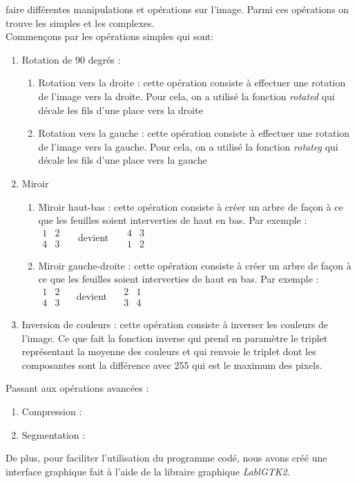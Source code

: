 \documentclass[12pt]{article}
\begin{document}
faire différentes manipulations et opérations sur l'image. Parmi ces opérations on trouve les simples et les complexes. \\
Commençons par les opérations simples qui sont:
\begin{enumerate}
\item Rotation de 90 degrés :
\begin{enumerate}
\item Rotation vers la droite : cette opération consiste à effectuer une rotation de l'image vers la droite. Pour cela, on a utilisé la fonction \textit{rotated} qui décale les fils d'une place vers la droite	
\item Rotation vers la gauche : cette opération consiste à effectuer une rotation de l'image vers la gauche. Pour cela, on a utilisé la fonction \textit{rotateg} qui décale les fils d'une place vers la gauche   
\end{enumerate}
\item Miroir
\begin{enumerate}
\item Miroir haut-bas : cette opération consiste à créer un arbre de façon à ce que les feuilles soient interverties de haut en bas. Par exemple : \\
		   $\begin{matrix}
		   1 & 2 \\
		   4 & 3
		   \end{matrix} \quad $\ devient\
		   $\quad \begin{matrix}
		   4 & 3 \\
		   1 & 2
		   \end{matrix}$
\item Miroir gauche-droite : cette opération consiste à créer un arbre de façon à ce que les feuilles soient interverties de haut en bas. Par exemple :  \\
		   $\begin{matrix}
		   1 & 2 \\
		   4 & 3
		   \end{matrix} \quad$ devient
		   $\quad  \begin{matrix}
		   2 & 1 \\
		   3 & 4
		   \end{matrix}$
\end{enumerate}
\item Inversion de couleurs : cette opération consiste à inverser les couleurs de l'image. Ce que fait la fonction inverse qui prend en paramètre le triplet représentant la moyenne des couleurs et qui renvoie le triplet dont les composantes sont la différence avec 255 qui est le maximum des pixels. 
\end{enumerate}
Passant aux opérations avancées :
\begin{enumerate}
\item Compression : 
\item Segmentation : 
\end{enumerate}
De plus, pour faciliter l'utilisation du programme codé, nous avons créé une interface graphique fait à l'aide de la libraire graphique \textit{LablGTK2}.
\end{document}
